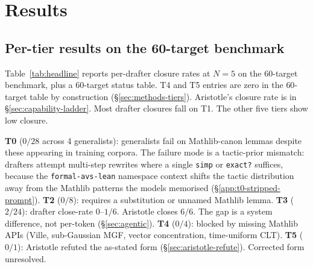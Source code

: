 \section{Results}
\label{sec:results}

\subsection{Per-tier results on the 60-target benchmark}

Table~\ref{tab:headline} reports per-drafter closure rates at
$N=5$ on the $60$-target benchmark, plus a
$60$-target status table. T4 and T5 entries are zero in the
$60$-target table by construction
(\S\ref{sec:methods-tiers}). Aristotle's closure rate is in
\S\ref{sec:capability-ladder}. Most drafter closures fall on
T1. The other five tiers show low closure.

\textbf{T0} ($0/28$ across 4 generalists): generalists fail on
Mathlib-canon lemmas despite these appearing in training corpora.
The failure mode is a tactic-prior mismatch: drafters attempt
multi-step rewrites where a single \texttt{simp} or
\texttt{exact?} suffices, because the \texttt{formal-avs-lean}
namespace context shifts the tactic distribution away from the
Mathlib patterns the models memorised
(\S\ref{app:t0-stripped-prompt}).
\textbf{T2} ($0/8$): requires a substitution or unnamed
Mathlib lemma.
\textbf{T3} ($2/24$): drafter close-rate $0$--$1/6$. Aristotle
closes $6/6$. The gap is a system difference, not per-token
(\S\ref{sec:agentic}).
\textbf{T4} ($0/4$): blocked by missing Mathlib APIs (Ville,
sub-Gaussian MGF, vector concentration, time-uniform CLT).
\textbf{T5} ($0/1$): Aristotle refuted the as-stated form
(\S\ref{sec:aristotle-refute}). Corrected form unresolved.

